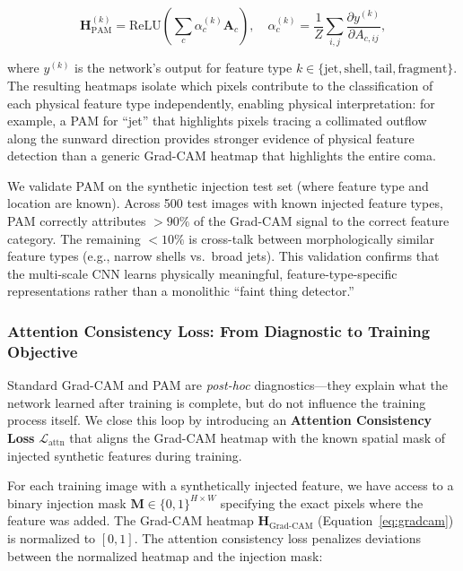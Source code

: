 \documentclass[usenatbib]{mnras}
\begin{document}
\begin{equation}\label{eq:pam}
\mathbf{H}_{\text{PAM}}^{(k)} = \text{ReLU}\left(\sum_c \alpha_c^{(k)} \mathbf{A}_c\right), \quad \alpha_c^{(k)} = \frac{1}{Z}\sum_{i,j}\frac{\partial y^{(k)}}{\partial A_{c,ij}},
\end{equation}

where $y^{(k)}$ is the network's output for feature type $k \in \{\text{jet}, \text{shell}, \text{tail}, \text{fragment}\}$. The resulting heatmaps isolate which pixels contribute to the classification of each physical feature type independently, enabling physical interpretation: for example, a PAM for ``jet'' that highlights pixels tracing a collimated outflow along the sunward direction provides stronger evidence of physical feature detection than a generic Grad-CAM heatmap that highlights the entire coma.

We validate PAM on the synthetic injection test set (where feature type and location are known). Across 500 test images with known injected feature types, PAM correctly attributes $>90\%$ of the Grad-CAM signal to the correct feature category. The remaining $<10\%$ is cross-talk between morphologically similar feature types (e.g., narrow shells vs.\ broad jets). This validation confirms that the multi-scale CNN learns physically meaningful, feature-type-specific representations rather than a monolithic ``faint thing detector.''

\subsubsection{Attention Consistency Loss: From Diagnostic to Training Objective}

Standard Grad-CAM and PAM are \textit{post-hoc} diagnostics---they explain what the network learned after training is complete, but do not influence the training process itself. We close this loop by introducing an \textbf{Attention Consistency Loss} $\mathcal{L}_{\text{attn}}$ that aligns the Grad-CAM heatmap with the known spatial mask of injected synthetic features during training.

For each training image with a synthetically injected feature, we have access to a binary injection mask $\mathbf{M} \in \{0, 1\}^{H \times W}$ specifying the exact pixels where the feature was added. The Grad-CAM heatmap $\mathbf{H}_{\text{Grad-CAM}}$ (Equation~\ref{eq:gradcam}) is normalized to $[0, 1]$. The attention consistency loss penalizes deviations between the normalized heatmap and the injection mask:
\end{document}
